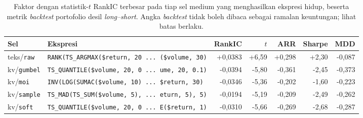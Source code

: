 \begin{table}[htbp]
\centering
\caption{Faktor dengan statistik-$t$ RankIC terbesar pada tiap sel medium yang menghasilkan ekspresi hidup, beserta metrik \textit{backtest} portofolio desil \textit{long--short}. Angka \textit{backtest} tidak boleh dibaca sebagai ramalan keuntungan; lihat batas berlaku.}
\label{tab:kartu-faktor}
\small
\begin{tabular}{llrrrrr}
\hline
Sel & Ekspresi & RankIC & $t$ & ARR & Sharpe & MDD \\
\hline
teks/\texttt{raw} & \texttt{\scriptsize RANK(TS\_ARGMAX(\$return, 20 ... (\$volume, 30)} & +0,0383 & +6,59 & +0,298 & +2,30 & -0,087 \\
kv/\texttt{gumbel} & \texttt{\scriptsize TS\_QUANTILE(\$volume, 20, 0 ... ume, 20, 0.1)} & -0,0394 & -5,80 & -0,361 & -2,45 & -0,373 \\
kv/\texttt{moi} & \texttt{\scriptsize INV(LOG(SUMAC(\$volume, 10) ...  \$return, 30)} & -0,0346 & -5,36 & -0,202 & -1,60 & -0,223 \\
kv/\texttt{sample} & \texttt{\scriptsize TS\_MAD(TS\_SUM(\$volume, 5), ... eturn, 5), 5)} & -0,0194 & -5,19 & -0,209 & -2,49 & -0,262 \\
kv/\texttt{soft} & \texttt{\scriptsize TS\_QUANTILE(\$volume, 20, 0 ... E(\$return, 1)} & -0,0310 & -5,66 & -0,269 & -2,68 & -0,287 \\
\hline
\end{tabular}
\end{table}
